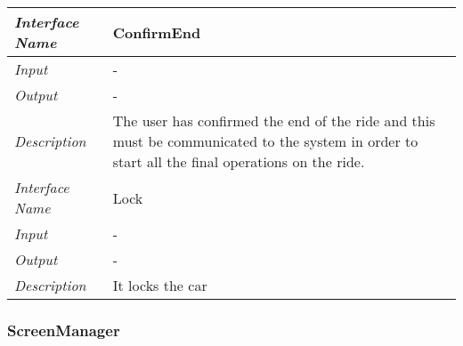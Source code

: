 \documentclass[11pt,a4paper]{report}
\begin{document}
\begin{tabularx}{\textwidth}{|>{\em}l|X|}
		\hline
		\hline
		Interface Name& ConfirmEnd\\
		\hline
		Input & -\\
		\hline
		Output & -\\
		\hline
		Description &The user has confirmed the end of the ride and this must be communicated to the system in order to start all the final operations on the ride.\\
		\hline
		\hline
		Interface Name& Lock\\
		\hline
		Input & -\\
		\hline
		Output & -\\
		\hline
		Description &It locks the car\\
		\hline
	\end{tabularx}
\subsubsection{ScreenManager}
\end{document}
